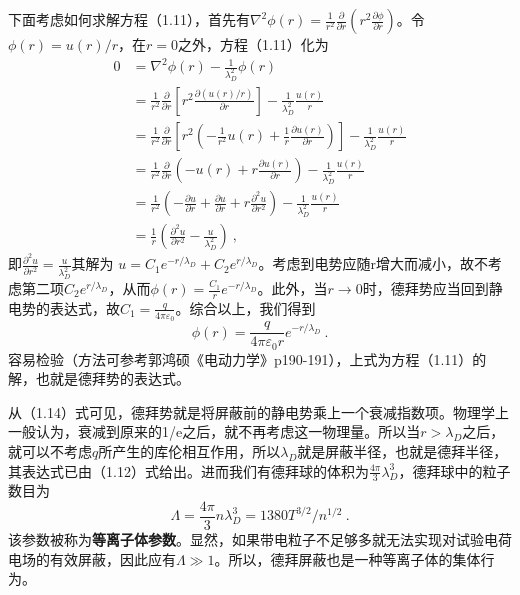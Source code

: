 			下面考虑如何求解方程（1.11），首先有$\nabla^2\phi(r)=\frac{1}{r^2}\frac{\partial}{\partial r}\left(r^2\frac{\partial\phi}{\partial r}\right)$。令$\phi(r)=u(r)/r$，在$r=0$之外，方程（1.11）化为
			\begin{equation} 
			\begin{aligned}
			0&=\nabla^2\phi(r)-\frac{1}{\lambda_D^2}\phi(r)\\
			&=\frac{1}{r^2}\frac{\partial}{\partial r}\left[r^2\frac{\partial(u(r)/r)}{\partial r}\right]-\frac{1}{\lambda_D^2}\frac{u(r)}{r}\\
			&=\frac{1}{r^2}\frac{\partial}{\partial r}\left[r^2\left(-\frac{1}{r^2}u(r)+\frac{1}{r}\frac{\partial u(r)}{\partial r}\right)\right]-\frac{1}{\lambda_D^2}\frac{u(r)}{r}\\
			&=\frac{1}{r^2}\frac{\partial}{\partial r}\left(-u(r)+r\frac{\partial u(r)}{\partial r}\right)-\frac{1}{\lambda_D^2}\frac{u(r)}{r}\\
			&=\frac{1}{r^2}\left(-\frac{\partial u}{\partial r}+\frac{\partial u}{\partial r}+r\frac{\partial^2 u}{\partial r^2}\right)-\frac{1}{\lambda_D^2}\frac{u(r)}{r}\\
			&=\frac{1}{r}\left(\frac{\partial^2 u}{\partial r^2}-\frac{u}{\lambda_D^2}\right)~,
			\end{aligned}
			\end{equation}
			即$\frac{\partial^2 u}{\partial r^2}=\frac{u}{\lambda_D^2}$其解为
			$u=C_1 e^{-r/\lambda_D}+C_2 e^{r/\lambda_D}$。考虑到电势应随r增大而减小，故不考虑第二项$C_2 e^{r/\lambda_D}$，从而$\phi(r)=\frac{C_1}{r}e^{-r/\lambda_D}$。此外，当$r\to 0$时，德拜势应当回到静电势的表达式，故$C_1=\frac{q}{4\pi \varepsilon_0}$。综合以上，我们得到
			\begin{equation} 
			\boxed{\phi(r)=\frac{q}{4\pi \varepsilon_0 r}e^{-r/\lambda_D}~.}
			\end{equation}
			容易检验（方法可参考郭鸿硕《电动力学》p190-191），上式为方程（1.11）的解，也就是德拜势的表达式。
			
			从（1.14）式可见，德拜势就是将屏蔽前的静电势乘上一个衰减指数项。物理学上一般认为，衰减到原来的1/e之后，就不再考虑这一物理量。所以当$r>\lambda_D$之后，就可以不考虑$q$所产生的库伦相互作用，所以$\lambda_D$就是屏蔽半径，也就是德拜半径，其表达式已由（1.12）式给出。进而我们有德拜球的体积为$\frac{4\pi}{3}\lambda_D^3$，德拜球中的粒子数目为
			\begin{equation} 
			\boxed{\varLambda=\frac{4\pi}{3}n\lambda_D^3=1380T^{3/2}/n^{1/2}~.}
			\end{equation}
			该参数被称为\textbf{等离子体参数}。显然，如果带电粒子不足够多就无法实现对试验电荷电场的有效屏蔽，因此应有$\varLambda\gg 1$。所以，德拜屏蔽也是一种等离子体的集体行为。
			
